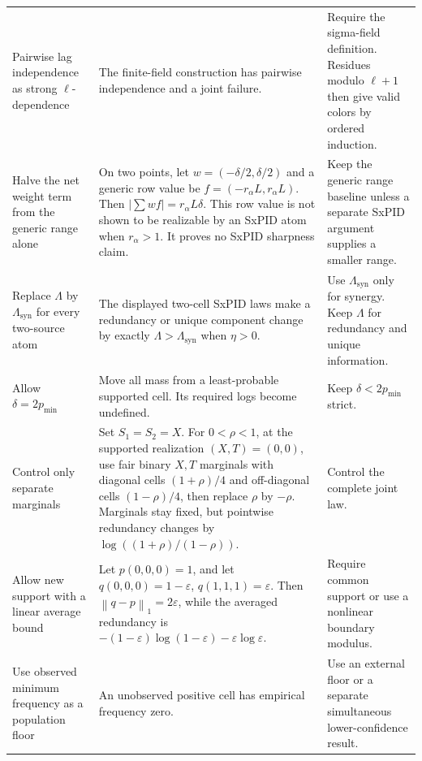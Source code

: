 \documentclass[11pt]{article}
\theoremstyle{definition}
\newcommand{\normone}[1]{\left\lVert #1\right\rVert_1}
\begin{document}
\begin{longtable}{L{0.24\textwidth}L{0.43\textwidth}L{0.23\textwidth}}
\addlinespace
Pairwise lag independence as strong $\ell$-dependence & The finite-field construction has pairwise
independence and a joint failure. & Require the sigma-field definition.  Residues modulo
$\ell+1$ then give valid colors by ordered induction. \\
\addlinespace
Halve the net weight term from the generic range alone & On two points, let
$w=(-\delta/2,\delta/2)$ and a generic row value be
$f=(-r_\alpha L,r_\alpha L)$.  Then $|\sum wf|=r_\alpha L\delta$.  This row value is not shown to
be realizable by an SxPID atom when $r_\alpha>1$.  It proves no SxPID sharpness claim. & Keep the
generic range baseline unless a separate SxPID argument supplies a smaller range. \\
\addlinespace
Replace $\Lambda$ by $\Lambda_{\mathrm{syn}}$ for every two-source atom & The displayed two-cell
SxPID laws make a redundancy or unique component change by exactly
$\Lambda>\Lambda_{\mathrm{syn}}$ when $\eta>0$. & Use $\Lambda_{\mathrm{syn}}$ only for synergy.
Keep $\Lambda$ for redundancy and unique information. \\
\addlinespace
Allow $\delta=2p_{\min}$ & Move all mass from a least-probable supported cell.  Its required logs
become undefined. & Keep $\delta<2p_{\min}$ strict. \\
\addlinespace
Control only separate marginals & Set $S_1=S_2=X$.  For $0<\rho<1$, at the supported realization
$(X,T)=(0,0)$, use fair binary $X,T$ marginals with diagonal cells $(1+\rho)/4$ and off-diagonal cells
$(1-\rho)/4$, then replace $\rho$ by $-\rho$.  Marginals stay fixed, but pointwise redundancy
changes by $\log((1+\rho)/(1-\rho))$. & Control the complete joint law. \\
\addlinespace
Allow new support with a linear average bound & Let $p(0,0,0)=1$, and let
$q(0,0,0)=1-\varepsilon$, $q(1,1,1)=\varepsilon$.  Then $\normone{q-p}=2\varepsilon$, while the
averaged redundancy is
$-(1-\varepsilon)\log(1-\varepsilon)-\varepsilon\log\varepsilon$. & Require common support or use
a nonlinear boundary modulus. \\
\addlinespace
Use observed minimum frequency as a population floor & An unobserved positive cell has empirical
frequency zero. & Use an external floor or a separate simultaneous lower-confidence result. \\
\bottomrule
\end{longtable}
\end{document}
